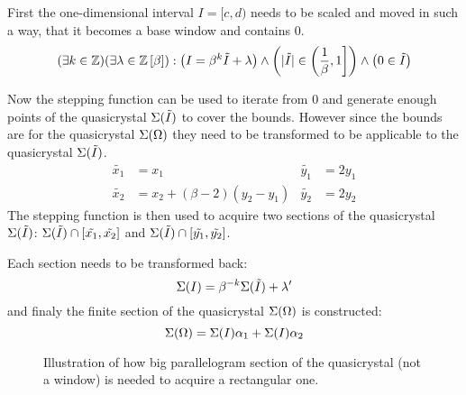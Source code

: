 \documentclass[text.tex]{subfiles}
\begin{document}
First the one-dimensional interval $I = [c,d)$ needs to be scaled and moved in such a way, that it becomes a base window and contains $0$.
$$(\exists k\in\mathbb{Z})(\exists \lambda\in\mathbb{Z}\left[\beta\right]) : \left(I = \beta^k\tilde{I}+\lambda\right) \wedge \left(|\tilde{I}| \in \left(\frac{1}{\beta},1\right] \right)\wedge \left(0\in\tilde{I}\right)$$

Now the stepping function can be used to iterate from 0 and generate enough points of the quasicrystal $\Sigma(\tilde{I})$ to cover the bounds. However since the bounds are for the quasicrystal $\Sigma(\Omega)$ they need to be transformed to be applicable to the quasicrystal $\Sigma(\tilde{I})$. 
\begin{align*}
\tilde{x_1} &= x_1 & \tilde{y_1} &= 2y_1 \\
\tilde{x_2} &= x_2 + (\beta-2)(y_2-y_1) & \tilde{y_2} &= 2y_2 
\end{align*}
The stepping function is then used to acquire two sections of the quasicrystal $\Sigma(\tilde{I})$: $\Sigma(\tilde{I})\cap[\tilde{x_1},\tilde{x_2}]$ and $\Sigma(\tilde{I})\cap[\tilde{y_1},\tilde{y_2}]$.

Each section needs to be transformed back:
$$\Sigma(I) = \beta^{-k}\Sigma(\tilde{I}) + \lambda'$$
and finaly the finite section of the quasicrystal $\Sigma(\Omega)$ is constructed:
$$\Sigma(\Omega) = \Sigma(I)\alpha_1 + \Sigma(I)\alpha_2$$

\begin{figure}[h]
\centering
{}
\caption{Illustration of how big parallelogram section of the quasicrystal (not a window) is needed to acquire a rectangular one.}
\label{fig:finiteSectionRhombus}
\end{figure}
\end{document}
